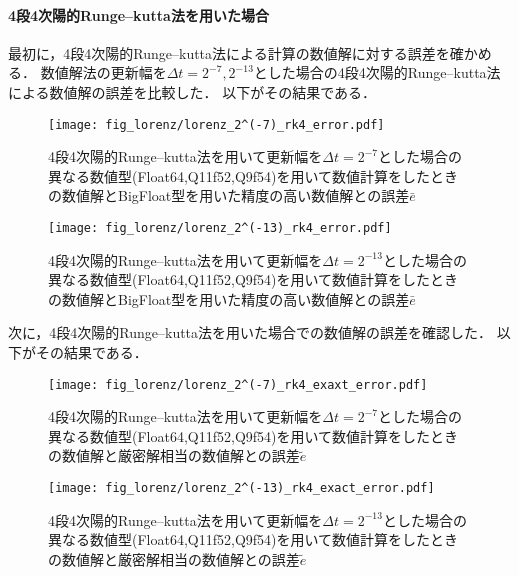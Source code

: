 \paragraph*{4段4次陽的Runge--kutta法を用いた場合}
最初に，4段4次陽的Runge--kutta法による計算の数値解に対する誤差を確かめる．
数値解法の更新幅を$\Delta t = 2^{-7},2^{-13}$とした場合の4段4次陽的Runge--kutta法による数値解の誤差を比較した．
以下がその結果である．
\begin{figure}[H]
    \centering
    \begin{minipage}[b]{0.48\columnwidth}
        \centering
        \texttt{[image: fig\_lorenz/lorenz\_2^(-7)\_rk4\_error.pdf]}
        \caption{4段4次陽的Runge--kutta法を用いて更新幅を$\Delta t = 2^{-7}$とした場合の異なる数値型(Float64,Q11f52,Q9f54)を用いて数値計算をしたときの数値解とBigFloat型を用いた精度の高い数値解との誤差$\bar{e}$}
        \label{fig:lorenz_2^(-7)_rk4_error}
    \end{minipage}
    \hspace{0.01\columnwidth}
    \begin{minipage}[b]{0.48\columnwidth}
        \centering
        \texttt{[image: fig\_lorenz/lorenz\_2^(-13)\_rk4\_error.pdf]}
        \caption{4段4次陽的Runge--kutta法を用いて更新幅を$\Delta t =  2^{-13}$とした場合の異なる数値型(Float64,Q11f52,Q9f54)を用いて数値計算をしたときの数値解とBigFloat型を用いた精度の高い数値解との誤差$\bar{e}$}
        \label{fig:lorenz_2^(-13)_rk4_error}
    \end{minipage}
\end{figure}
次に，4段4次陽的Runge--kutta法を用いた場合での数値解の誤差を確認した．
以下がその結果である．
\begin{figure}[H]
    \centering
    \begin{minipage}[b]{0.48\columnwidth}
        \centering
        \texttt{[image: fig\_lorenz/lorenz\_2^(-7)\_rk4\_exaxt\_error.pdf]}
        \caption{4段4次陽的Runge--kutta法を用いて更新幅を$\Delta t = 2^{-7}$とした場合の異なる数値型(Float64,Q11f52,Q9f54)を用いて数値計算をしたときの数値解と厳密解相当の数値解との誤差$\tilde{e}$}
        \label{fig:lorenz_2^(-7)_rk4_exact_error}
    \end{minipage}
    \hspace{0.01\columnwidth}
    \begin{minipage}[b]{0.48\columnwidth}
        \centering
        \texttt{[image: fig\_lorenz/lorenz\_2^(-13)\_rk4\_exact\_error.pdf]}
        \caption{4段4次陽的Runge--kutta法を用いて更新幅を$\Delta t =  2^{-13}$とした場合の異なる数値型(Float64,Q11f52,Q9f54)を用いて数値計算をしたときの数値解と厳密解相当の数値解との誤差$\tilde{e}$}
        \label{fig:lorenz_2^(-13)_rk4_exact_error}
    \end{minipage}
\end{figure}

